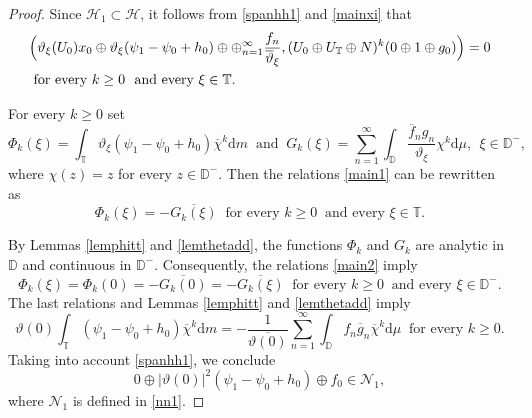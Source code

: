 \documentclass[a4paper,oneside,11pt]{amsart}
\numberwithin{equation}{section}
\theoremstyle{plain}
\theoremstyle{definition}
\begin{document}
\begin{proof}
Since $\mathcal H_1\subset\mathcal H$, it follows from \eqref{spanhh1} and \eqref{mainxi} that 
  \begin{equation}\label{main1}
\begin{aligned}
&\Bigl(\vartheta_\xi(U_0) x_0\oplus\vartheta_\xi (\psi_1-\psi_0+h_0)\oplus  
\oplus_{n=1}^\infty\frac{f_n}{\overline\vartheta_\xi}, (U_0\oplus U_{\mathbb T}\oplus N)^k(0\oplus 1\oplus g_0)\Bigr)=0
\\& \text{ for every } k\geq 0 \ \text{ and every } \xi\in\mathbb T.
\end{aligned}
\end{equation}

For every $k\geq 0$ set 
\begin{equation*} \Phi_k(\xi)=\int_{\mathbb T}\vartheta_\xi (\psi_1-\psi_0+h_0)\overline\chi^k\mathrm{d}m 
\ \text{ and }\ 
G_k(\xi)=
\sum_{n=1}^\infty\int_{\mathbb D}\frac{\overline f_n g_n}{\vartheta_\xi}\chi^k\mathrm{d}\mu,  
\ \ \xi\in\mathbb D^-,
\end{equation*}
where $\chi(z)=z$ for every $z\in\mathbb D^-$. 
Then the relations \eqref{main1} can be rewritten as 
 \begin{equation}\label{main2} \Phi_k(\xi)=-\overline{ G_k(\xi)}\ \text{ for every } k\geq 0 \ \text{ and every } \xi\in\mathbb T.
\end{equation}

By Lemmas \ref{lemphitt} and  \ref{lemthetadd}, the functions $\Phi_k$ and $G_k$ are analytic in $\mathbb D$ and 
continuous in $\mathbb D^-$. Consequently,  the relations \eqref{main2} imply
\begin{equation*} \Phi_k(\xi)= \Phi_k(0)=-\overline{ G_k(0)}=-\overline{ G_k(\xi)}\ \text{ for every } k\geq 0 
\ \text{ and every } \xi\in\mathbb D^- .
\end{equation*}
The last relations and  Lemmas \ref{lemphitt} and  \ref{lemthetadd} imply 
\begin{equation*} \vartheta(0)\int_{\mathbb T} (\psi_1-\psi_0+h_0)\overline\chi^k\mathrm{d}m 
=-\frac{1}{\overline{\vartheta(0)}} \sum_{n=1}^\infty\int_{\mathbb D}
f_n\overline g_n\overline\chi^k\mathrm{d}\mu\ \text{ for every } k\geq 0 .
\end{equation*}
Taking into account \eqref{spanhh1}, we conclude  
\begin{equation}\label{orth} 0\oplus |\vartheta(0)|^2(\psi_1-\psi_0+h_0)\oplus f_0\in\mathcal N_1,
\end{equation}
where $\mathcal N_1$ is defined in \eqref{nn1}.


\end{proof}
\end{document}
